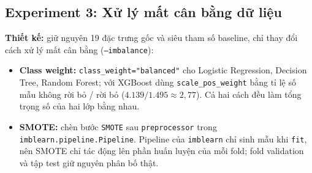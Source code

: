 \subsection{Experiment 3: Xử lý mất cân bằng dữ liệu}\label{sec:exp3}
\textbf{Thiết kế:} giữ nguyên 19 đặc trưng gốc và siêu tham số baseline, chỉ thay đổi cách xử lý mất cân bằng (\texttt{--imbalance}):
\begin{itemize}
    \item \textbf{Class weight:} \texttt{class\_weight="balanced"} cho Logistic Regression, Decision Tree, Random Forest; với XGBoost dùng \texttt{scale\_pos\_weight} bằng tỉ lệ số mẫu không rời bỏ / rời bỏ ($4.139 / 1.495 \approx 2{,}77$). Cả hai cách đều làm tổng trọng số của hai lớp bằng nhau.
    \item \textbf{SMOTE:} chèn bước \texttt{SMOTE} sau \texttt{preprocessor} trong \texttt{imblearn.pipeline.}\allowbreak\texttt{Pipeline}. Pipeline của \texttt{imblearn} chỉ sinh mẫu khi \texttt{fit}, nên SMOTE chỉ tác động lên phần huấn luyện của mỗi fold; fold validation và tập test giữ nguyên phân bố thật.
\end{itemize}

